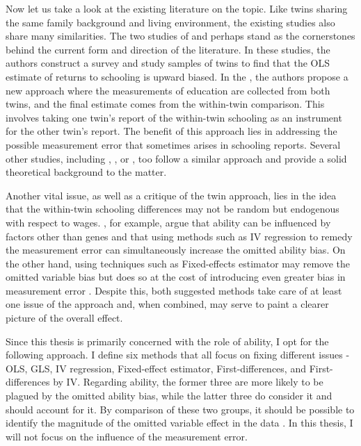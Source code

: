 Now let us take a look at the existing literature on the topic. Like twins sharing the same family background and living environment, the existing studies also share many similarities. The two studies of \cite{ashenfelter1994estimates} and \cite{ashenfelter1998income} perhaps stand as the cornerstones behind the current form and direction of the literature. In these studies, the authors construct a survey and study samples of twins to find that the \ac{OLS} estimate of returns to schooling is upward biased. In the \cite{ashenfelter1994estimates}, the authors propose a new approach where the measurements of education are collected from both twins, and the final estimate comes from the within-twin comparison. This involves taking one twin's report of the within-twin schooling as an instrument for the other twin's report. The benefit of this approach lies in addressing the possible measurement error that sometimes arises in schooling reports. Several other studies, including \cite{behrman1994endowments}, \cite{isacsson1999estimates}, or \cite{bonjour2003returns}, too follow a similar approach and provide a solid theoretical background to the matter.

Another vital issue, as well as a critique of the twin approach, lies in the idea that the within-twin schooling differences may not be random but endogenous with respect to wages. \cite{bound1999double}, for example, argue that ability can be influenced by factors other than genes and that using methods such as \ac{IV} regression to remedy the measurement error can simultaneously increase the omitted ability bias. On the other hand, using techniques such as Fixed-effects estimator may remove the omitted variable bias but does so at the cost of introducing even greater bias in measurement error \citep{ning2005economic}. Despite this, both suggested methods take care of at least one issue of the approach and, when combined, may serve to paint a clearer picture of the overall effect.

Since this thesis is primarily concerned with the role of ability, I opt for the following approach. I define six methods that all focus on fixing different issues - \ac{OLS}, \ac{GLS}, \ac{IV} regression, Fixed-effect estimator, First-differences, and First-differences by \ac{IV}. Regarding ability, the former three are more likely to be plagued by the omitted ability bias, while the latter three do consider it and should account for it. By comparison of these two groups, it should be possible to identify the magnitude of the omitted variable effect in the data \citep{rouse1999further}. In this thesis, I will not focus on the influence of the measurement error.

